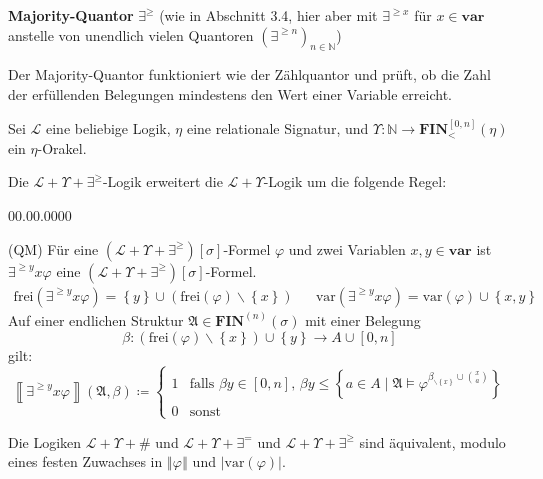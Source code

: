 \begin{defn}
\textbf{Majority-Quantor }$\exists^{\geqslant}$ (wie in \cite{EbbinghausFlum}
Abschnitt 3.4, hier aber mit $\exists^{\geqslant x}$ für $x\in\mathbf{var}$
anstelle von unendlich vielen Quantoren $\left(\exists^{\geqslant n}\right)_{n\in\mathbb{N}}$)

Der Majority-Quantor funktioniert wie der Zählquantor und prüft, ob
die Zahl der erfüllenden Belegungen mindestens den Wert einer Variable
erreicht.

Sei $\mathcal{L}$ eine beliebige Logik, $\eta$ eine relationale
Signatur, und $\Upsilon:\mathbb{N}\rightarrow\mathbf{FIN}_{<}^{\left[0,n\right]}\left(\eta\right)$
ein $\eta$-Orakel.

Die $\mathcal{L}+\Upsilon+\exists^{\geqslant}$-Logik erweitert die
$\mathcal{L}+\Upsilon$-Logik um die folgende Regel:

\begin{labeling}{00.00.0000}
\item [{(QM)}] Für eine $\left(\mathcal{L}+\Upsilon+\exists^{\geqslant}\right)\left[\sigma\right]$-Formel
$\varphi$ und zwei Variablen $x,y\in\mathbf{var}$ ist $\exists^{\geqslant y}x\varphi$
eine $\left(\mathcal{L}+\Upsilon+\exists^{\geqslant}\right)\left[\sigma\right]$-Formel.
\begin{eqnarray*}
\mathrm{frei}\left(\exists^{\geqslant y}x\varphi\right)=\left\{ y\right\} \cup\left(\mathrm{frei}\left(\varphi\right)\backslash\left\{ x\right\} \right) &  & \mathrm{var}\left(\exists^{\geqslant y}x\varphi\right)=\mathrm{var}\left(\varphi\right)\cup\left\{ x,y\right\} 
\end{eqnarray*}
Auf einer endlichen Struktur $\mathfrak{A}\in\mathbf{FIN}^{\left(n\right)}\left(\sigma\right)$
mit einer Belegung 
\[
\beta:\left(\mathrm{frei}\left(\varphi\right)\backslash\left\{ x\right\} \right)\cup\left\{ y\right\} \rightarrow A\cup\left[0,n\right]
\]
 gilt: 
\[
\left\llbracket \exists^{\geqslant y}x\varphi\right\rrbracket \left(\mathfrak{A},\beta\right)\coloneqq\begin{cases}
1 & \mathrm{falls}\,\,\beta y\in\left[0,n\right],\,\beta y\leqslant\left\{ a\in A\mid\mathfrak{A}\models\varphi^{\beta_{\backslash\left\{ x\right\} }\cup\binom{x}{a}}\right\} \\
0 & \mathrm{sonst}
\end{cases}
\]
\end{labeling}
\end{defn}
\begin{prop}
\label{prop:counting-equal}Die Logiken $\mathcal{L}+\Upsilon+\#$
und $\mathcal{L}+\Upsilon+\exists^{=}$ und $\mathcal{L}+\Upsilon+\exists^{\geqslant}$
sind äquivalent, modulo eines festen Zuwachses in $\left\Vert \varphi\right\Vert $
und $\left|\mathrm{var}\left(\varphi\right)\right|$.
\end{prop}
